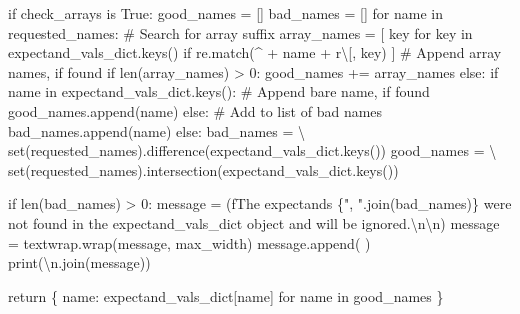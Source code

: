 \documentclass[
  letterpaper,
  DIV=11,
  numbers=noendperiod]{scrartcl}
\newenvironment{Shaded}{\begin{snugshade}}{\end{snugshade}}
\newcommand{\BuiltInTok}[1]{\textcolor[rgb]{0.00,0.23,0.31}{#1}}
\newcommand{\CharTok}[1]{\textcolor[rgb]{0.13,0.47,0.30}{#1}}
\newcommand{\CommentTok}[1]{\textcolor[rgb]{0.37,0.37,0.37}{#1}}
\newcommand{\ControlFlowTok}[1]{\textcolor[rgb]{0.00,0.23,0.31}{#1}}
\newcommand{\DecValTok}[1]{\textcolor[rgb]{0.68,0.00,0.00}{#1}}
\newcommand{\KeywordTok}[1]{\textcolor[rgb]{0.00,0.23,0.31}{#1}}
\newcommand{\NormalTok}[1]{\textcolor[rgb]{0.00,0.23,0.31}{#1}}
\newcommand{\OperatorTok}[1]{\textcolor[rgb]{0.37,0.37,0.37}{#1}}
\newcommand{\SpecialCharTok}[1]{\textcolor[rgb]{0.37,0.37,0.37}{#1}}
\newcommand{\SpecialStringTok}[1]{\textcolor[rgb]{0.13,0.47,0.30}{#1}}
\newcommand{\StringTok}[1]{\textcolor[rgb]{0.13,0.47,0.30}{#1}}
\newcommand{\VariableTok}[1]{\textcolor[rgb]{0.07,0.07,0.07}{#1}}
\newcommand{\VerbatimStringTok}[1]{\textcolor[rgb]{0.13,0.47,0.30}{#1}}
\begin{document}
\begin{Shaded}
\begin{Highlighting}[]
  \ControlFlowTok{if}\NormalTok{ check\_arrays }\KeywordTok{is} \VariableTok{True}\NormalTok{:}
\NormalTok{    good\_names }\OperatorTok{=}\NormalTok{ []}
\NormalTok{    bad\_names }\OperatorTok{=}\NormalTok{ []}
    \ControlFlowTok{for}\NormalTok{ name }\KeywordTok{in}\NormalTok{ requested\_names:}
      \CommentTok{\# Search for array suffix}
\NormalTok{      array\_names }\OperatorTok{=}\NormalTok{ [ key }\ControlFlowTok{for}\NormalTok{ key }\KeywordTok{in}\NormalTok{ expectand\_vals\_dict.keys()}
                      \ControlFlowTok{if}\NormalTok{ re.match(}\StringTok{\textquotesingle{}\^{}\textquotesingle{}} \OperatorTok{+}\NormalTok{ name }\OperatorTok{+} \VerbatimStringTok{r\textquotesingle{}\textbackslash{}[\textquotesingle{}}\NormalTok{, key) ]}
      \CommentTok{\# Append array names, if found}
      \ControlFlowTok{if} \BuiltInTok{len}\NormalTok{(array\_names) }\OperatorTok{\textgreater{}} \DecValTok{0}\NormalTok{:}
\NormalTok{        good\_names }\OperatorTok{+=}\NormalTok{ array\_names}
      \ControlFlowTok{else}\NormalTok{:}
        \ControlFlowTok{if}\NormalTok{ name }\KeywordTok{in}\NormalTok{ expectand\_vals\_dict.keys():}
          \CommentTok{\# Append bare name, if found}
\NormalTok{          good\_names.append(name)}
        \ControlFlowTok{else}\NormalTok{:}
          \CommentTok{\# Add to list of bad names}
\NormalTok{          bad\_names.append(name)}
  \ControlFlowTok{else}\NormalTok{:}
\NormalTok{    bad\_names }\OperatorTok{=} \OperatorTok{\textbackslash{}}
      \BuiltInTok{set}\NormalTok{(requested\_names).difference(expectand\_vals\_dict.keys())}
\NormalTok{    good\_names }\OperatorTok{=} \OperatorTok{\textbackslash{}}
      \BuiltInTok{set}\NormalTok{(requested\_names).intersection(expectand\_vals\_dict.keys())}

  \ControlFlowTok{if} \BuiltInTok{len}\NormalTok{(bad\_names) }\OperatorTok{\textgreater{}} \DecValTok{0}\NormalTok{:}
\NormalTok{    message }\OperatorTok{=}\NormalTok{ (}\SpecialStringTok{f\textquotesingle{}The expectands }\SpecialCharTok{\{}\StringTok{", "}\SpecialCharTok{.}\NormalTok{join(bad\_names)}\SpecialCharTok{\}}\SpecialStringTok{ \textquotesingle{}}
               \StringTok{\textquotesingle{}were not found in the \textasciigrave{}expectand\_vals\_dict\textasciigrave{} \textquotesingle{}}
               \StringTok{\textquotesingle{}object and will be ignored.}\CharTok{\textbackslash{}n\textbackslash{}n}\StringTok{\textquotesingle{}}\NormalTok{)}
\NormalTok{    message }\OperatorTok{=}\NormalTok{ textwrap.wrap(message, max\_width)}
\NormalTok{    message.append(}\StringTok{\textquotesingle{} \textquotesingle{}}\NormalTok{)}
    \BuiltInTok{print}\NormalTok{(}\StringTok{\textquotesingle{}}\CharTok{\textbackslash{}n}\StringTok{\textquotesingle{}}\NormalTok{.join(message))}

  \ControlFlowTok{return}\NormalTok{ \{ name: expectand\_vals\_dict[name] }\ControlFlowTok{for}\NormalTok{ name }\KeywordTok{in}\NormalTok{ good\_names \}}
\end{Highlighting}
\end{Shaded}
\end{document}
